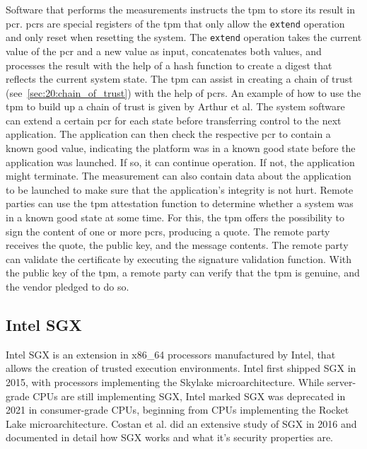 Software that performs the measurements instructs the \gls{tpm} to store its
result in \gls{pcr}. \glspl{pcr} are special registers of the \gls{tpm} that only
allow the \texttt{extend} operation and only reset when resetting the system.
The \texttt{extend} operation takes the current value of the \gls{pcr} and a new
value as input, concatenates both values, and processes the result with the help
of a hash function to create a digest that reflects the current system state.
The \gls{tpm} can assist in creating a chain of trust
(see~\ref{sec:20:chain_of_trust}) with the help of \glspl{pcr}. An example of how
to use the \gls{tpm} to build up a chain of trust is given by Arthur et
al.\cite{arthur2015practical} The system software can extend a certain \gls{pcr}
for each state before transferring control to the next application. The
application can then check the respective \gls{pcr} to contain a known good
value, indicating the platform was in a known good state before the application
was launched. If so, it can continue operation. If not, the application might
terminate. The measurement can also contain data about the application to be
launched to make sure that the application's integrity is not hurt. Remote
parties can use the \gls{tpm} attestation function to determine whether a system
was in a known good state at some time. For this, the \gls{tpm} offers the
possibility to sign the content of one or more \glspl{pcr}, producing a quote.
The remote party receives the quote, the public key, and the message contents.
The remote party can validate the certificate by executing the signature
validation function. With the public key of the \gls{tpm}, a remote party can
verify that the \gls{tpm} is genuine, and the vendor pledged to do so.

\subsection{Intel SGX}
\label{sec:20:sgx}
Intel SGX is an extension in x86\_64 processors manufactured by Intel, that
allows the creation of trusted execution environments. Intel first shipped SGX
in 2015, with processors implementing the Skylake microarchitecture. While
server-grade CPUs are still implementing SGX, Intel marked SGX was deprecated in
2021 in consumer-grade CPUs, beginning from CPUs implementing the Rocket Lake
microarchitecture. Costan et al. did an extensive study of SGX in 2016 and
documented in detail how SGX works and what it's security properties
are.\cite{costan2016intel} \\

